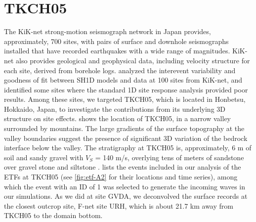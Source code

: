 \section{TKCH05}\label{etf:tkch05}
The KiK-net strong-motion seismograph network in Japan provides, approximately, 700 sites, with pairs of surface and downhole seismographs installed that have recorded earthquakes with a wide range of magnitudes. KiK-net also provides geological and geophysical data, including velocity structure for each site, derived from borehole logs. \citet{thompsonTaxonomySiteResponse2012} analyzed the interevent variability and goodness of fit between SH1D models and data at 100 sites from KiK-net, and identified some sites where the standard 1D site response analysis provided poor results. Among these sites, we targeted TKCH05, which is located in Honbetsu, Hokkaido, Japan, to investigate the contributions from its underlying 3D structure on site effects.  shows the location of TKCH05, in a narrow valley surrounded by mountains. The large gradients of the surface topography at the valley boundaries suggest the presence of significant 3D variation of the bedrock interface below the valley. The stratigraphy at TKCH05 is, approximately, 6 m of soil and sandy gravel with $V_S$ = 140 m/s, overlying tens of meters of sandstone over gravel stone and siltstone \citep[see \cref{fig:etf-6};][]{nationalresearchinstituteforearthscienceanddisasterresilienceNIEDKNETKiKnet2019}.  lists the events included in our analysis of the ETFs at TKCH05 (see \cref{fig:etf-A2} for their locations and time series), among which the event with an ID of 1 was selected to generate the incoming waves in our simulations. As we did at site GVDA, we deconvolved the surface records at the closest outcrop site, F-net site URH, which is about 21.7 km away from TKCH05 to the domain bottom.

